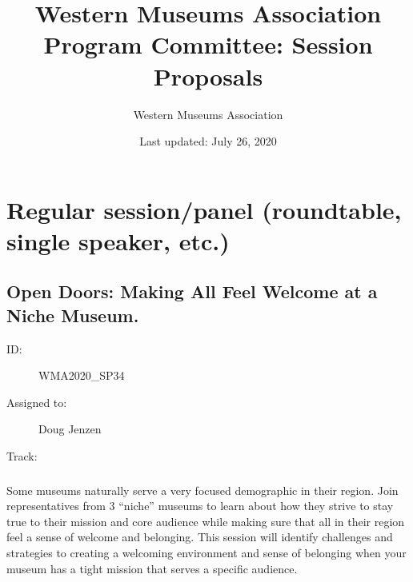 \documentclass{report}
\title{ Western Museums Association Program Committee: Session Proposals }
\date{ Last updated: July 26, 2020}
\author{Western Museums Association}
\begin{document}
  \maketitle
  \newpage
  \tableofcontents
  \newpage
  
    \newpage
    \chapter*{ Regular session/panel (roundtable, single speaker, etc.) }

      
        
  
        
  
        
  
        
          \newpage
          \section{ Open Doors:  Making All Feel Welcome at a Niche Museum.  }
            \begin{description}
              \item [ID:]
              WMA2020\_SP34

              \item [Assigned to:]Doug Jenzen~
                \item [Track:]
              \end{description}
              \subsection*{}
                Some museums naturally serve a very focused demographic in their region. Join representatives from 3 “niche” museums to learn about how they strive to stay true to their mission and core audience while making sure that all in their region feel a sense of welcome and belonging. This session will identify challenges and strategies to creating a welcoming environment and sense of belonging when your museum has a tight mission that serves a specific audience.
\end{document}
